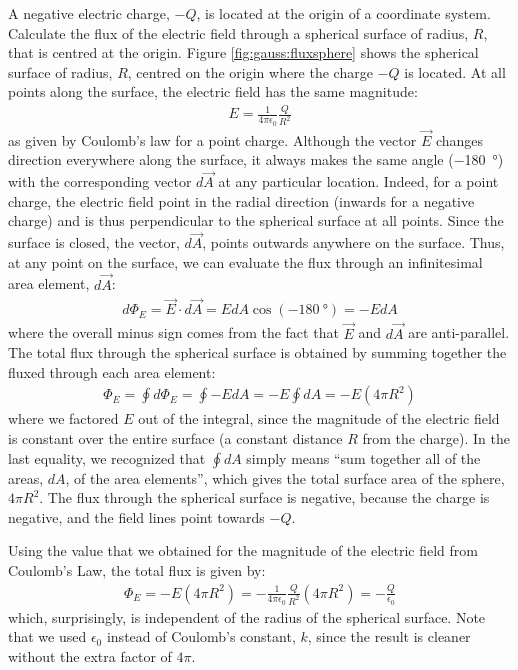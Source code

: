 \begin{example}{A negative electric charge, $-Q$, is located at the origin of a coordinate system. Calculate the flux of the electric field through a spherical surface of radius, $R$, that is centred at the origin.}\label{ex:gauss:qsphere}
Figure \ref{fig:gauss:fluxsphere} shows the spherical surface of radius, $R$, centred on the origin where the charge $-Q$ is located.
At all points along the surface, the electric field has the same magnitude:
\begin{align*}
E=\frac{1}{4\pi\epsilon_0}\frac{Q}{R^2}
\end{align*}
as given by Coulomb's law for a point charge. Although the vector $\vec E$ changes direction everywhere along the surface, it always makes the same angle (\SI{-180}{\degree}) with the corresponding vector $d\vec A$ at any particular location. Indeed, for a point charge, the electric field point in the radial direction (inwards for a negative charge) and is thus perpendicular to the spherical surface at all points. Since the surface is closed, the vector, $d\vec A$, points outwards anywhere on the surface. Thus, at any point on the surface, we can evaluate the flux through an infinitesimal area element, $d\vec A$:
\begin{align*}
d\Phi_E=\vec E\cdot d\vec A=EdA\cos(\SI{-180}{\degree})=-EdA
\end{align*}
where the overall minus sign comes from the fact that $\vec E$ and $d\vec A$ are anti-parallel. The total flux through the spherical surface is obtained by summing together the fluxed through each area element:
\begin{align*}
\Phi_E=\oint d\Phi_E=\oint -EdA=-E\oint dA=-E(4\pi R^2)
\end{align*}
where we factored $E$ out of the integral, since the magnitude of the electric field is constant over the entire surface (a constant distance $R$ from the charge). In the last equality, we recognized that $\oint dA$ simply means ``sum together all of the areas, $dA$, of the area elements'', which gives the total surface area of the sphere, $4\pi R^2$. The flux through the spherical surface is negative, because the charge is negative, and the field lines point towards $-Q$.

Using the value that we obtained for the magnitude of the electric field from Coulomb's Law, the total flux is given by:
\begin{align*}
\Phi_E=-E(4\pi R^2)=-\frac{1}{4\pi\epsilon_0}\frac{Q}{R^2}(4\pi R^2)=-\frac{Q}{\epsilon_0}
\end{align*}
which, surprisingly, is independent of the radius of the spherical surface. Note that we used $\epsilon_0$ instead of Coulomb's constant, $k$, since the result is cleaner without the extra factor of $4\pi$. 


\end{example}
